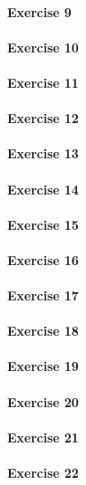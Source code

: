\documentclass[a4paper,10pt]{article}
\begin{document}
\paragraph{Exercise 9}
\label{ex09a}
\paragraph{Exercise 10}
\label{ex10a}
\paragraph{Exercise 11}
\label{ex11a}
\paragraph{Exercise 12}
\label{ex12a}
\paragraph{Exercise 13}
\label{ex13a}
\paragraph{Exercise 14}
\label{ex14a}
\paragraph{Exercise 15}
\label{ex15a}
\paragraph{Exercise 16}
\label{ex16a}
\paragraph{Exercise 17}
\label{ex17a}
\paragraph{Exercise 18}
\label{ex18a}
\paragraph{Exercise 19}
\label{ex19a}
\paragraph{Exercise 20}
\label{ex20a}
\paragraph{Exercise 21}
\label{ex21a}
\paragraph{Exercise 22}
\label{ex22a}
\end{document}
